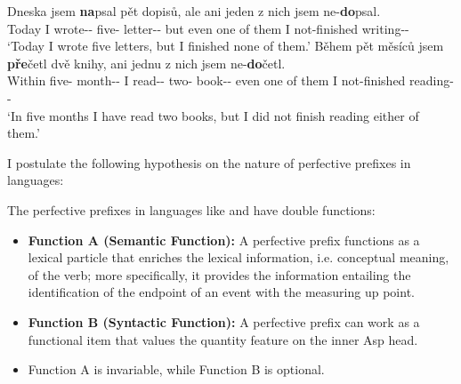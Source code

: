 \documentclass[output=paper]{langsci/langscibook}
\begin{document}
\begin{exe}
\ex {} \begin{xlist}
    \ex \gll Dneska jsem \textbf{na}psal p\v{e}t dopis\r{u}, \llap{*}ale ani jeden z nich jsem ne-\textbf{do}psal. \\
        Today I {wrote-\Pfv{}-\Sg{}{}} {five-\Acc{}} {letter-\Pl{}-\Poss{}} but even one of them I {not-finished writing-\Pfv{}-\Sg{}} \\
        \glt \enquote*{Today I wrote five letters, but I finished none of them.}
    \ex \gll B\v{e}hem p\v{e}t m\v{e}s\'ic\r{u} jsem \textbf{pře}četl dv\v{e}
    knihy, \llap{*}ani jednu z nich jsem ne-\textbf{do}četl.\\
        Within {five-\Poss{}} {month-\Pl{}-\Poss{}} I {read-\Pfv{}-\Sg{}{}} {two-\Acc{}} {book-\Pl{}-\Acc{}} even one of them I {not-finished reading-\Pfv{}-\Sg{}} \\
        \glt \enquote*{In five months I have read two books, but I did not finish reading either of them.}
    \end{xlist}
\end{exe}


I postulate the following hypothesis on the nature of perfective prefixes in  languages:
\begin{exe}
\ex\label{perf hypo} The perfective prefixes in  languages like  and  have double functions:
    \begin{itemize}
        \item \textbf{Function A (Semantic Function):} A 
            perfective prefix functions as a lexical particle that enriches the
            lexical information, i.e. conceptual meaning, of the verb; more
            specifically, it provides the information entailing the
            identification of the endpoint of an event with the measuring up
            point.
        \item \textbf{Function B (Syntactic Function):} A  perfective prefix can work as a functional item that values the quantity feature on the inner Asp head.
        \item Function A is invariable, while Function B is optional.
    \end{itemize}
\end{exe}
\end{document}
